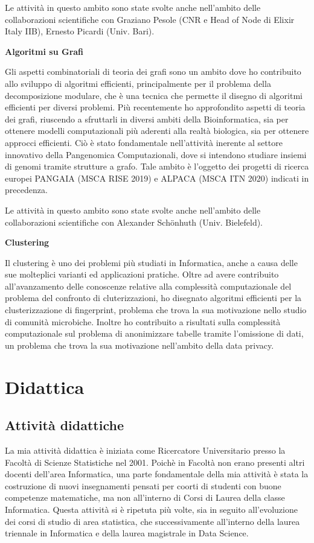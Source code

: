 \documentclass[11pt,a4paper,roman]{moderncv}        %
\begin{document}
  Le attività in questo ambito sono state svolte anche nell'ambito delle
  collaborazioni scientifiche con Graziano Pesole (CNR e Head of Node di
  Elixir Italy IIB), Ernesto Picardi (Univ. Bari).

  \textbf{Algoritmi su Grafi}

  Gli aspetti combinatoriali di teoria dei grafi sono un ambito dove ho
  contribuito allo sviluppo di algoritmi efficienti, principalmente per il
  problema della decomposizione modulare, che è una tecnica che permette
  il disegno di algoritmi efficienti per diversi problemi. Più
  recentemente ho approfondito aspetti di teoria dei grafi, riuscendo a
  sfruttarli in diversi ambiti della Bioinformatica, sia per ottenere
  modelli computazionali più aderenti alla realtà biologica, sia per
  ottenere approcci efficienti. Ciò è stato fondamentale nell'attività
  inerente al settore innovativo della Pangenomica Computazionali, dove si
  intendono studiare insiemi di genomi tramite strutture a grafo. Tale
  ambito è l'oggetto dei progetti di ricerca europei PANGAIA (MSCA RISE
  2019) e ALPACA (MSCA ITN 2020) indicati in precedenza.

  Le attività in questo ambito sono state svolte anche nell'ambito delle
  collaborazioni scientifiche con Alexander Schönhuth (Univ. Bielefeld).

  \textbf{Clustering}

  Il clustering è uno dei problemi più studiati in Informatica, anche a
  causa delle sue molteplici varianti ed applicazioni pratiche. Oltre ad
  avere contribuito all'avanzamento delle conoscenze relative alla
  complessità computazionale del problema del confronto di
  cluterizzazioni, ho disegnato algoritmi efficienti per la
  clusterizzazione di fingerprint, problema che trova la sua motivazione
  nello studio di comunità microbiche. Inoltre ho contribuito a risultati
  sulla complessità computazionale sul problema di anonimizzare tabelle
  tramite l'omissione di dati, un problema che trova la sua motivazione
  nell'ambito della data privacy.


  \section{Didattica}


  \subsection{Attività didattiche}

  La mia attività didattica è iniziata come Ricercatore Universitario
  presso la Facoltà di Scienze Statistiche nel 2001. Poichè in Facoltà non
  erano presenti altri docenti dell'area Informatica, una parte
  fondamentale della mia attività è stata la costruzione di nuovi
  insegnamenti pensati per coorti di studenti con buone competenze
  matematiche, ma non all'interno di Corsi di Laurea della classe
  Informatica. Questa attività si è ripetuta più volte, sia in seguito
  all'evoluzione dei corsi di studio di area statistica, che
  successivamente all'interno della laurea triennale in Informatica e
  della laurea magistrale in Data Science.
\end{document}
